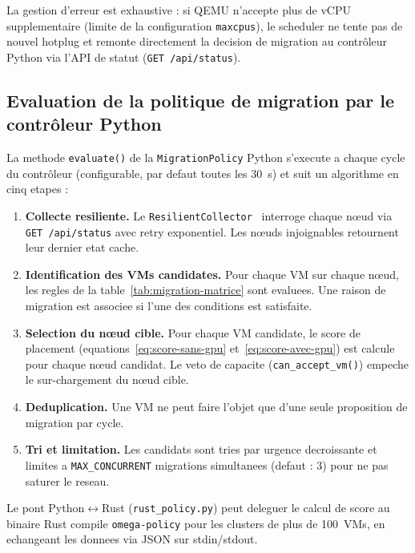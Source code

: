 La gestion d'erreur est exhaustive : si QEMU n'accepte plus de vCPU supplementaire (limite de la configuration \texttt{maxcpus}), le scheduler ne tente pas de nouvel hotplug et remonte directement la decision de migration au contrôleur Python via l'API de statut (\texttt{GET /api/status}).

\subsection{Evaluation de la politique de migration par le contrôleur Python}
\label{subsec:impl-migration-policy}

La methode \texttt{evaluate()} de la \texttt{MigrationPolicy} Python s'execute a chaque cycle du contrôleur (configurable, par defaut toutes les 30~s) et suit un algorithme en cinq etapes :

\begin{enumerate}
    \item \textbf{Collecte resiliente.} Le \texttt{ResilientCollector}~\cite{nygard_release} interroge chaque nœud via \texttt{GET /api/status} avec retry exponentiel. Les nœuds injoignables retournent leur dernier etat cache.
    \item \textbf{Identification des VMs candidates.} Pour chaque VM sur chaque nœud, les regles de la table~\ref{tab:migration-matrice} sont evaluees. Une raison de migration est associee si l'une des conditions est satisfaite.
    \item \textbf{Selection du nœud cible.} Pour chaque VM candidate, le score de placement (equations~\ref{eq:score-sans-gpu} et~\ref{eq:score-avec-gpu}) est calcule pour chaque nœud candidat. Le veto de capacite (\texttt{can\_accept\_vm()}) empeche le sur-chargement du nœud cible.
    \item \textbf{Deduplication.} Une VM ne peut faire l'objet que d'une seule proposition de migration par cycle.
    \item \textbf{Tri et limitation.} Les candidats sont tries par urgence decroissante et limites a \texttt{MAX\_CONCURRENT} migrations simultanees (defaut : 3) pour ne pas saturer le reseau.
\end{enumerate}

Le pont Python$\leftrightarrow$Rust (\texttt{rust\_policy.py}) peut deleguer le calcul de score au binaire Rust compile \texttt{omega-policy} pour les clusters de plus de 100~VMs, en echangeant les donnees via JSON sur stdin/stdout.

